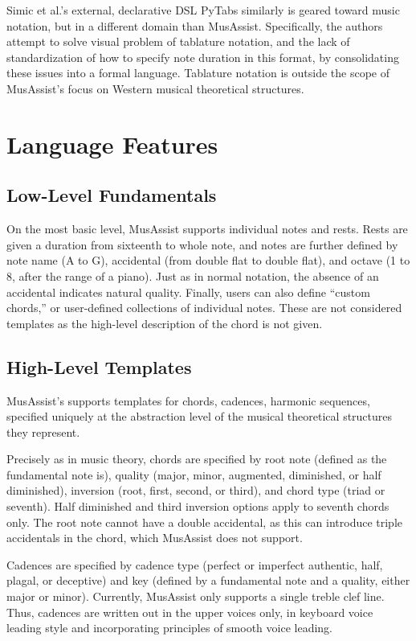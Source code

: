 \documentclass{article}
\begin{document}
Simic et al.'s external, declarative DSL PyTabs similarly is geared toward music notation, but in a different
domain than MusAssist. Specifically, 
the authors attempt to solve visual problem of  tablature  notation, 
and the lack of standardization of how  to specify note duration in this format, by consolidating 
these issues into a formal language. Tablature notation is outside the scope of MusAssist's focus on Western 
musical theoretical structures.

\section{Language Features}\label{sec:language_features}
\subsection{Low-Level Fundamentals}
On the most basic level, MusAssist supports individual notes and rests. Rests are  
given a duration from sixteenth to whole note, and notes are further defined by note name (A to G), 
accidental (from double flat to double flat), and octave (1 to 8, after the range of a piano).
Just as in normal notation, the absence of an accidental indicates natural quality.
Finally, users can also define ``custom chords,'' or user-defined collections of individual notes.
These are not considered templates as the high-level description of the chord is not given.

\subsection{High-Level Templates}
MusAssist's supports templates for chords, cadences, harmonic sequences, specified uniquely
at the abstraction level of the musical theoretical structures they represent. 

Precisely as in music theory, chords are specified by root note (defined as the fundamental note is),
quality (major, minor, augmented, diminished, or half diminished), 
inversion (root, first, second, or third), and chord type (triad or seventh). 
Half diminished and third inversion options apply to seventh chords only. The root note 
cannot have a double accidental, as this can introduce triple accidentals in the chord, which MusAssist
does not support.

Cadences are specified by cadence type (perfect or imperfect authentic, half, plagal, 
or deceptive) and key (defined by a fundamental note and a quality, either major or minor). 
Currently, MusAssist only supports a single treble clef line. Thus, cadences are written out in the 
upper voices only, in keyboard voice leading style and incorporating principles of smooth voice leading.
\end{document}
